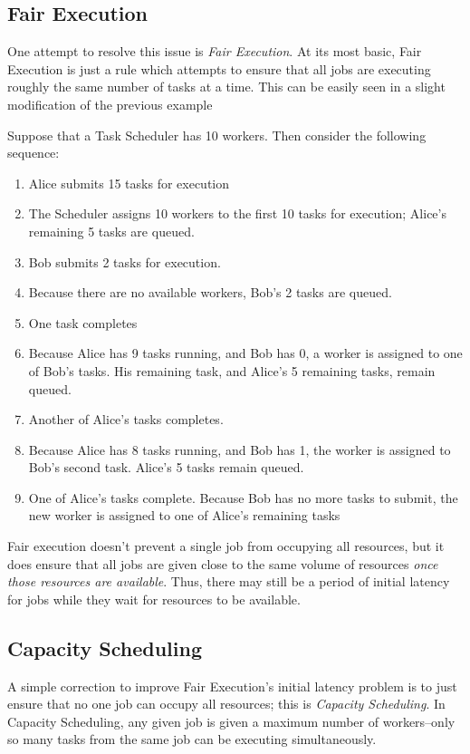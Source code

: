 \subsection{Fair Execution}
One attempt to resolve this issue is \emph{Fair Execution}. At its most basic, Fair Execution is just a rule which attempts to ensure that all jobs are executing roughly the same number of tasks at a time. This can be easily seen in a slight modification of the previous example

\begin{exmp}
Suppose that a Task Scheduler has 10 workers. Then consider the following sequence:

\begin{enumerate}
\item Alice submits 15 tasks for execution
\item The Scheduler assigns 10 workers to the first 10 tasks for execution; Alice's remaining 5 tasks are queued.
\item Bob submits 2 tasks for execution. 
\item Because there are no available workers, Bob's 2 tasks are queued.
\item One task completes
\item Because Alice has 9 tasks running, and Bob has 0, a worker is assigned to one of Bob's tasks. His remaining task, and Alice's 5 remaining tasks, remain queued.
\item Another of Alice's tasks completes.
\item Because Alice has 8 tasks running, and Bob has 1, the worker is assigned to Bob's second task. Alice's 5 tasks remain queued. 
\item One of Alice's tasks complete. Because Bob has no more tasks to submit, the new worker is assigned to one of Alice's remaining tasks
\end{enumerate}
\end{exmp}

Fair execution doesn't prevent a single job from occupying all resources, but it does ensure that all jobs are given close to the same volume of resources \emph{once those resources are available}. Thus, there may still be a period of initial latency for jobs while they wait for resources to be available.

\subsection{Capacity Scheduling}
A simple correction to improve Fair Execution's initial latency problem is to just ensure that no one job can occupy all resources; this is \emph{Capacity Scheduling}. In Capacity Scheduling, any given job is given a maximum number of workers--only so many tasks from the same job can be executing simultaneously.

